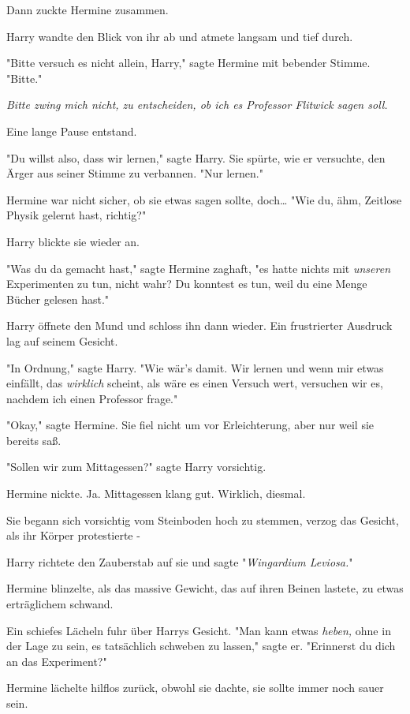 {Dann zuckte Hermine zusammen.

Harry wandte den Blick von ihr ab und atmete langsam und tief durch.

"Bitte versuch es nicht allein, Harry," sagte Hermine mit bebender Stimme. "Bitte."

\emph{Bitte zwing mich nicht, zu entscheiden, ob ich es Professor Flitwick sagen soll.}

Eine lange Pause entstand.

"Du willst also, dass wir lernen," sagte Harry. Sie spürte, wie er versuchte, den Ärger aus seiner Stimme zu verbannen. "Nur lernen."

Hermine war nicht sicher, ob sie etwas sagen sollte, doch… "Wie du, ähm, Zeitlose Physik gelernt hast, richtig?"

Harry blickte sie wieder an.

"Was du da gemacht hast," sagte Hermine zaghaft, "es hatte nichts mit \emph{unseren} Experimenten zu tun, nicht wahr? Du konntest es tun, weil du eine Menge Bücher gelesen hast."

Harry öffnete den Mund und schloss ihn dann wieder. Ein frustrierter Ausdruck lag auf seinem Gesicht.

"In Ordnung," sagte Harry. "Wie wär's damit. Wir lernen und wenn mir etwas einfällt, das \emph{wirklich} scheint, als wäre es einen Versuch wert, versuchen wir es, nachdem ich einen Professor frage."

"Okay," sagte Hermine. Sie fiel nicht um vor Erleichterung, aber nur weil sie bereits saß.

"Sollen wir zum Mittagessen?" sagte Harry vorsichtig.

Hermine nickte. Ja. Mittagessen klang gut. Wirklich, diesmal.

Sie begann sich vorsichtig vom Steinboden hoch zu stemmen, verzog das Gesicht, als ihr Körper protestierte -

Harry richtete den Zauberstab auf sie und sagte "\emph{Wingardium Leviosa.}"

Hermine blinzelte, als das massive Gewicht, das auf ihren Beinen lastete, zu etwas erträglichem schwand.

Ein schiefes Lächeln fuhr über Harrys Gesicht. "Man kann etwas \emph{heben,} ohne in der Lage zu sein, es tatsächlich schweben zu lassen," sagte er. "Erinnerst du dich an das Experiment?"

Hermine lächelte hilflos zurück, obwohl sie dachte, sie sollte immer noch sauer sein.

}
